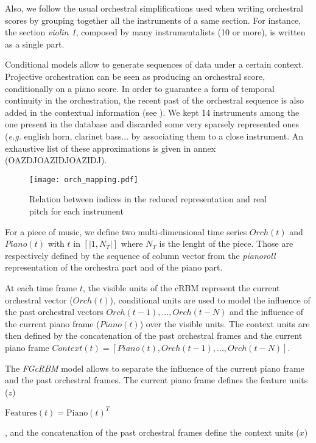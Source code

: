 \documentclass[letterpaper]{article}
\begin{document}
Also, we follow the usual orchestral simplifications used when writing orchestral scores by grouping together all the instruments of a same section. For instance, the section \textit{violin 1}, composed by many instrumentalists (10 or more), is written as a single part.

Conditional models allow to generate sequences of data under a certain context. Projective orchestration can be seen as producing an orchestral score, conditionally on a piano score. In order to guarantee a form of temporal continuity in the orchestration, the recent past of the orchestral sequence is also added in the contextual information (see ). We kept 14 instruments among the one present in the database and discarded some very sparsely represented ones (\textit{e.g.} english horn, clarinet bass... by associating them to a close instrument. An exhaustive list of these approximations is given in annex (OAZDJOAZIDJOAZIDJ).

\begin{figure}
\centering
\texttt{[image: orch\_mapping.pdf]}
\caption{Relation between indices in the reduced representation and real pitch for each instrument}
\label{fig:orch_mapping}
\end{figure}

For a piece of music, we define two multi-dimensional time series $Orch(t)$ and $Piano(t)$ with $t$ in $\left[ | 1 , N_{T} | \right]$ where $N_{T}$ is the lenght of the piece. Those are respectively defined by the sequence of column vector from the \textit{pianoroll} representation of the orchestra part and of the piano part.

At each time frame $t$, the visible units of the cRBM represent the current orchestral vector ($Orch(t)$), conditional units are used to model the influence of the past orchestral vectors $Orch(t-1) , ... , Orch(t-N)$ and the influence of the current piano frame ($Piano(t)$) over the visible units. The context units are then defined by the concatenation of the past orchestral frames and the current piano frame
$ Context(t) = \left[ Piano(t) , Orch(t-1) , ... , Orch(t-N)\right]$.

The \textit{FGcRBM} model allows to separate the influence of the current piano frame and the past orchestral frames. The current piano frame defines the feature units ($z$) 

$\text{Features}(t) = \text{Piano}(t)^{T}$

, and the concatenation of the past orchestral frames define the context units ($x$) 
\end{document}

